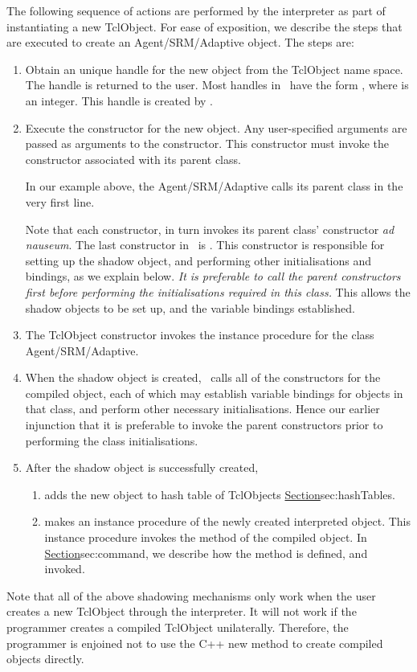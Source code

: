 The following sequence of actions are performed by the interpreter
as part of instantiating a new TclObject.
For ease of exposition, we describe the steps that are executed
to create an Agent/SRM/Adaptive object.
The steps are:
\begin{enumerate}
\item
  Obtain an unique handle for the new object   from the TclObject name space.
  The handle is returned to the user.
  Most handles in \ns\ have the form , where 
  is an integer.  This handle is created by
  .
\item Execute the constructor for the new object.
  Any user-specified arguments are passed as arguments to the constructor.
  This constructor must invoke the constructor
  associated with its parent class.

  In our example above, the Agent/SRM/Adaptive calls its parent class
  in the very first line.  

  Note that each constructor,
  in turn invokes its parent class' constructor \textit{ad nauseum}.
  The last constructor in \ns\ is
  .
  This constructor is responsible for setting up the shadow object, and 
  performing other initialisations and bindings, as we explain below.
  \emph{It is preferable to call the parent constructors first before
    performing the initialisations required in this class.}
  This allows the shadow objects to be set up,
  and the variable bindings established.
\item The TclObject constructor invokes the instance procedure
   for the class Agent/SRM/Adaptive.
\item When the shadow object is created,
  \ns\ calls all of the constructors for the compiled object,
  each of which may establish variable bindings for objects in that class,
  and perform other necessary initialisations.
  Hence our earlier injunction that it is preferable to invoke the parent
  constructors prior to performing the class initialisations.
\item After the shadow object is successfully created,
  \begin{enumerate}
  \item adds the new object to hash table of TclObjects
        \href{described earlier}{Section}{sec:hashTables}.
  \item makes  an instance procedure of the newly created
    interpreted object.
    This instance procedure
    invokes the  method of the compiled object.
    In \href{a later subsection}{Section}{sec:command},
    we describe how the  method is defined, and invoked.
  \end{enumerate}
\end{enumerate}
Note that all of the above shadowing mechanisms only work when
the user creates a new TclObject through the interpreter.
It will not work if the programmer creates a compiled TclObject unilaterally.
Therefore, the programmer is enjoined not to use the C++ new method
to create compiled objects directly.

